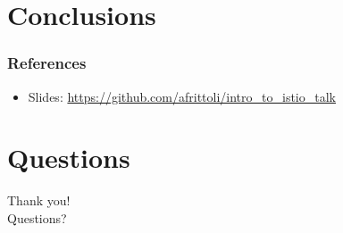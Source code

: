 \documentclass[aspectratio=169,11pt,hyperref={colorlinks=true}]{beamer}
\begin{document}
\section{Conclusions}

\begin{frame}
  \frametitle{References}
  \begin{itemize}
      \item{Slides: \href{https://github.com/afrittoli/intro\_to\_istio\_talk}{https://github.com/afrittoli/intro\_to\_istio\_talk}}
  \end{itemize}
\end{frame}

\section{Questions}
\begin{frame}[c]
    \begin{center}
        \Huge Thank you!\\Questions?
    \end{center}
\end{frame}
\end{document}
